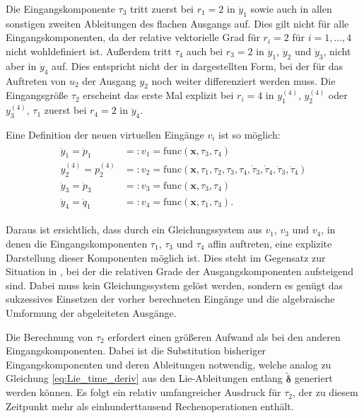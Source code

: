 Die Eingangskomponente $\tau_3$ tritt zuerst bei $r_1 = 2$ in $\ddot{y}_1$ sowie auch in allen sonstigen zweiten Ableitungen des flachen Ausgangs auf. Dies gilt nicht für alle Eingangskomponenten, da der relative vektorielle Grad für $r_i = 2$ für $i = 1, ..., 4$ nicht wohldefiniert ist. Außerdem tritt $\tau_4$ auch bei $r_3 = 2$ in $\ddot{y}_1$, $\ddot{y}_2$ und $\ddot{y}_3$, nicht aber in $\ddot{y}_4$ auf. Dies entspricht nicht der in \cite[S. 206]{NLRT_Roebenack} dargestellten Form, bei der für das Auftreten von $u_2$ der Ausgang $y_2$ noch weiter differenziert werden muss. Die Eingangsgröße $\tau_2$ erscheint das erste Mal explizit bei $r_i = 4$ in $y_1^{(4)}$, $y_2^{(4)}$ oder $y_3^{(4)}$, $\tau_1$ zuerst bei $r_4 = 2$ in $\ddot{y}_4$.

Eine Definition der neuen virtuellen Eingänge $v_i$ ist so möglich:
\begin{align}
\begin{split}
	\ddot{y}_1 = \ddot{p}_1 &=: v_1 = \mathrm{func}(\mathbf{x}, \tau_3, \tau_4) \\
	y_2^{(4)} = p_2^{(4)} &=: v_2 = \mathrm{func}(\mathbf{x}, \tau_1, \tau_2, \tau_3, \tau_4, \dot{\tau}_3, \dot{\tau}_4, \ddot{\tau}_3, \ddot{\tau}_4) \\
	\ddot{y}_3 = \ddot{p}_3 &=: v_3 = \mathrm{func}(\mathbf{x}, \tau_3, \tau_4) \\
	\ddot{y}_4 = \ddot{q}_1 &=: v_4 = \mathrm{func}(\mathbf{x}, \tau_1, \tau_3) .
\end{split}
\end{align}

Daraus ist ersichtlich, dass durch ein Gleichungssystem aus $v_1$, $v_3$ und $v_4$, in denen die Eingangskomponenten $\tau_1$, $\tau_3$ und $\tau_4$ affin auftreten, eine explizite Darstellung dieser Komponenten möglich ist. Dies steht im Gegensatz zur Situation in \cite[S. 207]{NLRT_Roebenack}, bei der die relativen Grade der Ausgangskomponenten aufsteigend sind. Dabei muss kein Gleichungssystem gelöst werden, sondern es genügt das sukzessives Einsetzen der vorher berechneten Eingänge und die algebraische Umformung der abgeleiteten Ausgänge.
 
Die Berechnung von $\tau_2$ erfordert einen größeren Aufwand als bei den anderen Eingangskomponenten. Dabei ist die Substitution bisheriger Eingangskomponenten und deren Ableitungen notwendig, welche analog zu Gleichung \eqref{eq:Lie_time_deriv} aus den Lie-Ableitungen entlang $\tilde{\boldsymbol{\delta}}$ generiert werden können. Es folgt ein relativ umfangreicher Ausdruck für $\tau_2$, der zu diesem Zeitpunkt mehr als einhunderttausend Rechenoperationen enthält.

